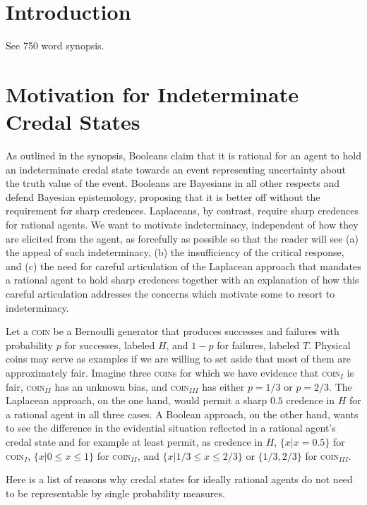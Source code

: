 \section{Introduction}
\label{Introduction}

See 750 word synopsis.

\section{Motivation for Indeterminate Credal States}
\label{MotivationForIndeterminateCredal States}

As outlined in the synopsis, Booleans claim that it is
rational for an agent to hold an indeterminate credal
state towards an event representing uncertainty about
the truth value of the event. Booleans are Bayesians in
all other respects and defend Bayesian epistemology,
proposing that it is better off without the requirement
for sharp credences. Laplaceans, by contrast, require
sharp credences for rational agents. We want to
motivate indeterminacy, independent of how they are
elicited from the agent, as forcefully as possible so
that the reader will see (a) the appeal of such
indeterminacy, (b) the insufficiency of the critical
response, and (c) the need for careful articulation of
the Laplacean approach that mandates a rational agent
to hold sharp credences together with an explanation of
how this careful articulation addresses the concerns
which motivate some to resort to indeterminacy.

Let a \textsc{coin} be a Bernoulli generator that
produces successes and failures with probability $p$
for successes, labeled $H$, and $1-p$ for failures,
labeled $T$. Physical coins may serve as examples if we
are willing to set aside that most of them are
approximately fair. Imagine three \textsc{coin}s for
which we have evidence that \textsc{coin}$_{I}$ is
fair, \textsc{coin}$_{II}$ has an unknown bias, and
\textsc{coin}$_{III}$ has either $p=1/3$ or $p=2/3$.
The Laplacean approach, on the one hand, would permit a
sharp $0.5$ credence in $H$ for a rational agent in all
three cases. A Boolean approach, on the other hand,
wants to see the difference in the evidential situation
reflected in a rational agent's credal state and for
example at least permit, as credence in $H$,
$\{x|x=0.5\}$ for \textsc{coin}$_{I}$,
$\{x|0\leq{}x\leq{}1\}$ for \textsc{coin}$_{II}$, and
$\{x|1/3\leq{}x\leq{}2/3\}$ or $\{1/3,2/3\}$ for
\textsc{coin}$_{III}$.

Here is a list of reasons why credal states for ideally
rational agents do not need to be representable by
single probability measures.

